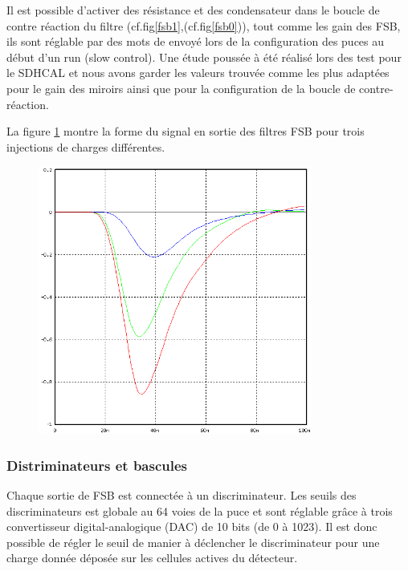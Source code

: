 Il est possible d'activer des résistance et des condensateur dans le boucle de contre réaction du filtre (cf.fig\ref{fsb1},(cf.fig\ref{fsb0})), tout comme les gain des FSB, ils sont réglable par des mots de envoyé lors de la configuration des puces au début d'un run (slow control). Une étude poussée à été réalisé lors des test pour le SDHCAL et nous avons garder les valeurs trouvée comme les plus adaptées pour le gain des miroirs ainsi que pour la configuration de la boucle de contre-réaction.

La figure \ref{signal} montre la forme du signal en sortie des filtres FSB pour trois injections de charges différentes.
\begin{figure}[ht!]
	\centering
	\includegraphics[width=0.8\textwidth]{GLA/SIGNAL.png}
	\label{signal}
\end{figure}

\subsubsection{Distriminateurs et bascules}
Chaque sortie de FSB est connectée à un discriminateur. Les seuils des discriminateurs est globale au 64 voies de la puce et sont réglable grâce à trois convertisseur digital-analogique (DAC) de 10 bits (de 0 à 1023). Il est donc possible de régler le seuil de manier à déclencher le discriminateur pour une charge donnée déposée sur les cellules actives du détecteur.

